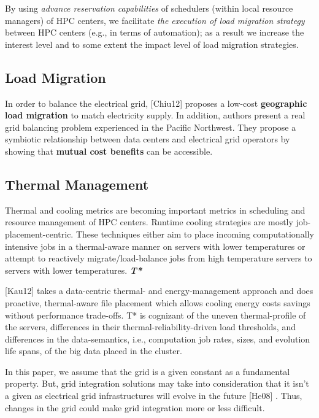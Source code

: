 \documentclass{llncs}
\begin{document}
By using \textit{advance reservation capabilities }of schedulers 
(within local resource managers) of HPC centers, we
facilitate \textit{the execution of load migration strategy }between 
HPC centers (e.g., in terms of automation); as a result
we increase the interest level and to some extent the impact level of load
migration strategies.

\subsection{Load Migration}

In order to balance the electrical grid,
\cite{chiu_electric_2012}
[Chiu12] proposes a low-cost
\textbf{geographic load migration} to match electricity supply. In addition,
authors present a real grid balancing problem experienced in the Pacific
Northwest. They propose a symbiotic relationship between data centers and
electrical grid operators by showing that \textbf{mutual cost benefits }can
be accessible.

\subsection{Thermal Management}
Thermal and cooling metrics are becoming important metrics in scheduling and
resource management of HPC centers. Runtime cooling strategies are mostly
job-placement-centric. These techniques either aim to place incoming
computationally intensive jobs in a thermal-aware manner on servers with
lower temperatures or attempt to reactively migrate/load-balance jobs from
high temperature servers to servers with lower temperatures.
\textbf{\textit{T* }} 

\cite{kaushik_t*:_2012}
[Kau12]
 takes a data-centric thermal- and
energy-management approach and does proactive, thermal-aware file placement
which allows cooling energy costs savings without performance trade-offs. T*
is cognizant of the uneven thermal-profile of the servers, differences in
their thermal-reliability-driven load thresholds, and differences in the
data-semantics, i.e., computation job rates, sizes, and evolution life
spans, of the big data placed in the cluster.

In this paper, we assume that the grid is a given constant as a fundamental
property. But, grid integration solutions may take into consideration that
it isn't a given as electrical grid infrastructures will evolve in the
future 
\cite{he_architecture_2008}
[He08]
. Thus, changes in the grid could make grid integration more or
less difficult.
\end{document}
